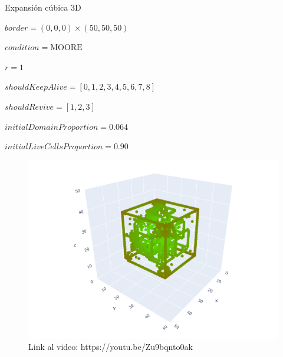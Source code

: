 \begin{frame}{Expansión cúbica 3D}
    \begin{multicols}{2}
        {
            $border = (0, 0, 0) \times (50, 50, 50)$

            $condition = \text{MOORE}$

            $r = 1$

            $shouldKeepAlive = [0, 1, 2, 3, 4, 5, 6, 7, 8]$

            $shouldRevive = [1, 2, 3]$

            $initialDomainProportion = 0.064$

            $initialLiveCellsProportion = 0.90$
        }

        {\begin{figure}[H]
             \centering
             \includegraphics[width=1\linewidth]{pic/cubo3d/thumbnail}
             \captionsetup{labelformat=empty}
             \caption{Link al video: https://youtu.be/Zu9bqnto0ak}
             \label{fig:expcub3d:thumbnail}
        \end{figure}}
    \end{multicols}
\end{frame}



